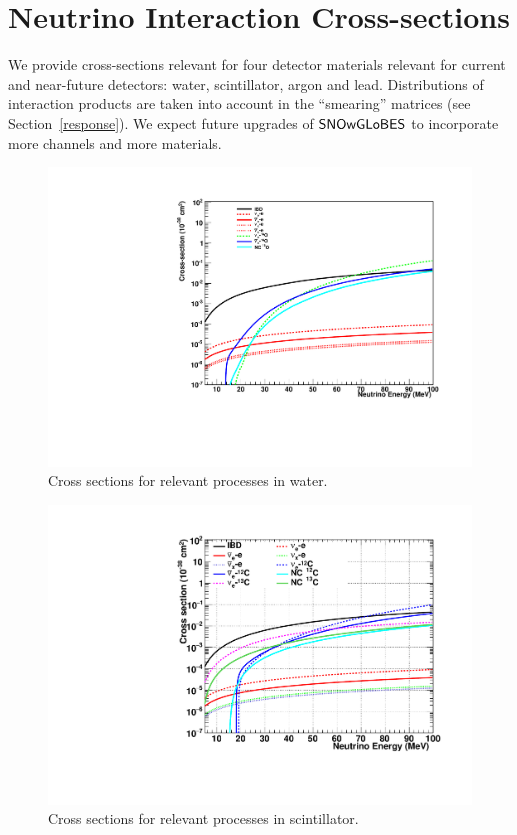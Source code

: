 \documentclass[12pt]{article}
\newcommand{\snowglobes}{\sf{SNOwGLoBES}}
\begin{document}
\section{Neutrino Interaction Cross-sections}

We provide cross-sections relevant for four detector materials relevant for current and near-future detectors:
water, scintillator, argon and lead.  Distributions of interaction
products are taken into account in the ``smearing'' matrices (see Section~\ref{response}).  We
expect future upgrades of $\snowglobes$ to incorporate more channels and
more materials.

\begin{figure}[htb]
  \centering\includegraphics[width=.75\textwidth]{figures/xscns_water.pdf}
  \caption{Cross sections for relevant processes in water.}
  \label{fig:water_xscns}
\end{figure}

\begin{figure}[htb]
  \centering\includegraphics[width=.75\textwidth]{figures/xscns_scint.pdf}
  \caption{Cross sections for relevant processes in scintillator.}
  \label{fig:scint_xscns}
\end{figure}
\end{document}
